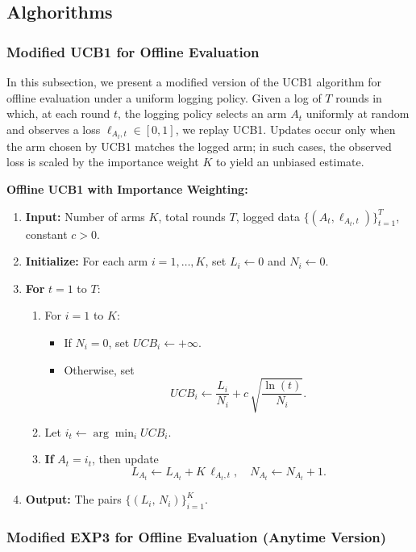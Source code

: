 \subsection{Alghorithms}

\subsubsection*{Modified UCB1 for Offline Evaluation}

In this subsection, we present a modified version of the UCB1 algorithm for offline evaluation under a uniform logging policy. Given a log of $T$ rounds in which, at each round $t$, the logging policy selects an arm $A_t$ uniformly at random and observes a loss $\ell_{A_t,t}\in[0,1]$, we replay UCB1. Updates occur only when the arm chosen by UCB1 matches the logged arm; in such cases, the observed loss is scaled by the importance weight $K$ to yield an unbiased estimate.

\textbf{Offline UCB1 with Importance Weighting:}
\begin{enumerate}
  \item \textbf{Input:} Number of arms $K$, total rounds $T$, logged data $\{(A_t,\ell_{A_t,t})\}_{t=1}^T$, constant $c>0$.
  \item \textbf{Initialize:} For each arm $i=1,\dots,K$, set $L_i \leftarrow 0$ and $N_i \leftarrow 0$.
  \item \textbf{For} $t = 1$ to $T$:
    \begin{enumerate}
      \item For $i = 1$ to $K$:
        \begin{itemize}
          \item If $N_i = 0$, set $UCB_i \leftarrow +\infty$.
          \item Otherwise, set 
          \[
            UCB_i \leftarrow \frac{L_i}{N_i} + c\,\sqrt{\frac{\ln(t)}{N_i}}.
          \]
        \end{itemize}
      \item Let $i_t \leftarrow \arg\min_{i} UCB_i$.
      \item \textbf{If} $A_t = i_t$, then update
      \[
        L_{A_t} \leftarrow L_{A_t} + K\,\ell_{A_t,t}, \quad N_{A_t} \leftarrow N_{A_t} + 1.
      \]
    \end{enumerate}
  \item \textbf{Output:} The pairs $\{(L_i,\,N_i)\}_{i=1}^K$.
\end{enumerate}

\subsubsection*{Modified EXP3 for Offline Evaluation (Anytime Version)}

